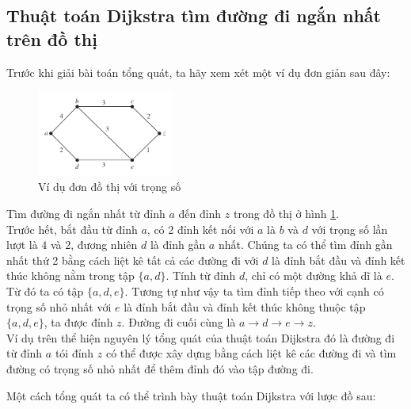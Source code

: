 \subsection{Thuật toán Dijkstra tìm đường đi ngắn nhất trên đồ thị}
Trước khi giải bài toán tổng quát, ta hãy xem xét một ví dụ đơn giản sau đây:

\begin{figure}[H] %
    \centering %
    \includegraphics[width=0.4\textwidth]{assets/gr_01.png} 
    \caption{Ví dụ đơn đồ thị với trọng số } %
    \label{fig:gr_01}
\end{figure}

Tìm đường đi ngắn nhất từ đỉnh $a$ đến đỉnh $z$ trong đồ thị ở hình \ref{fig:gr_01}.\\ 

Trước hết, bắt đầu từ đỉnh $a$, có 2 đỉnh kết nối với $a$ là $b$ và $d$ với trọng số 
lần lượt là $4$ và $2$, đương nhiên $d$ là đỉnh gần $a$ nhất. Chúng ta có thể tìm đỉnh 
gần nhất thứ 2 bằng cách liệt kê tất cả các đường đi với $d$ là đỉnh bắt đầu và đỉnh 
kết thúc không nằm trong tập $\{a, d\}$. Tính từ đỉnh $d$, chỉ có một đường khả dĩ là $e$.
Từ đó ta có tập $\{a, d, e\}$. Tương tự như vậy ta tìm đỉnh tiếp theo với cạnh có trọng số 
nhỏ nhất với $e$ là đỉnh bắt đầu và đỉnh kết thúc không thuộc tập $\{a, d, e\}$, ta được 
đỉnh $z$. Đường đi cuối cùng là $a \to d \to e \to z$. \\

Ví dụ trên thể hiện nguyên lý tổng quát của thuật toán Dijkstra đó là đường đi từ đỉnh $a$
tói đỉnh $z$ có thể được xây dựng bằng cách liệt kê các đường đi và tìm đường có trọng số 
nhỏ nhất để thêm đỉnh đó vào tập đường đi.

Một cách tổng quát ta có thể trình bày thuật toán Dijkstra với lược đồ sau:

